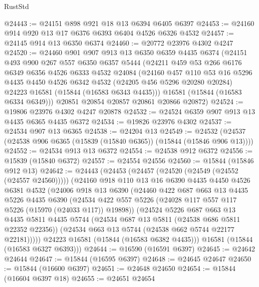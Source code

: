 \begin{lexlean}{RustStd}
\begin{coremodule}
@24443 := @24151 @898 @921 @18 @13 @6394 @6405 @6397
@24453 := @24160 @914 @920 @13 @17 @6376 @6393 @6404 @4526 @6326 @4532
@24457 := @24145 @914 @13 @6350 @6374
@24460 := @20772 @23976 @4302 @4247
@24520 := @24460
    @901
    @907
    @913
    @13
    @6350
    @6359
    @4435
    @6374
    (@24151
      @493
      @900
      @267
      @557
      @6350
      @6357
      @5444
      (@24211
        @459
        @53
        @266
        @6176
        @6349
        @6356
        @4526
        @6333
        @4532
        @24084
        (@24160
          @457
          @110
          @53
          @16
          @5296
          @4435
          @4450
          @4526
          @6342
          @4532
          (@24205 @456 @5296 @20280 @20284)
          @24223
          @16581
          (@15844 (@16583 @6343 @4435)))
        @16581
        (@15844 (@16583 @6334 @6349)))
      @20851
      @20854
      @20857
      @20861
      @20866
      @20872)
@24524 := @19806 @23976 @4302 @4247 @20878
@24532 := @24524 @6359 @907 @913 @13 @4435 @6365 @4435 @6372
@24534 := @19826 @23976 @4302
@24537 := @24534 @907 @13 @6365
@24538 := @24204 @13
@24549 := @24532 (@24537 (@24538 @906 @6365 (@15839 (@15840 @6365)) (@15844 (@15846 @906 @13))))
@24552 := @24534 @913 @13 @6372
@24554 := @24538 @912 @6372
@24556 := @15839 (@15840 @6372)
@24557 := @24554 @24556
@24560 := @15844 (@15846 @912 @13)
@24642 := @24443
    (@24453
      (@24457 (@24520 (@24549 (@24552 (@24557 @24560)))))
      (@24160
        @918
        @110
        @13
        @16
        @6390
        @4435
        @4450
        @4526
        @6381
        @4532
        (@24006
          @918
          @13
          @6390
          (@24460
            @422
            @687
            @663
            @13
            @4435
            @5226
            @4435
            @6390
            (@24534 @422 @557 @5226 (@24028 @117 @557 @117 @5226 (@15970 (@24033 @117)) @19898))
            (@24524
              @5226
              @687
              @663
              @13
              @4435
              @5811
              @4435
              @5744
              (@24534 @687 @13 @5811 (@24538 @686 @5811 @22352 @22356))
              (@24534 @663 @13 @5744 (@24538 @662 @5744 @22177 @22181)))))
        @24223
        @16581
        (@15844 (@16583 @6382 @4435)))
      @16581
      (@15844 (@16583 @6327 @6393)))
@24644 := @16590 (@16591 @6397)
@24645 := @24642 @24644
@24647 := @15844 (@16595 @6397)
@24648 := @24645 @24647
@24650 := @15844 (@16600 @6397)
@24651 := @24648 @24650
@24654 := @15844 (@16604 @6397 @18)
@24655 := @24651 @24654

\end{coremodule}
\end{lexlean}
